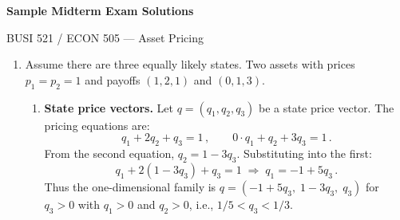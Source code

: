 



\centerline{\Large \textbf{Sample Midterm Exam Solutions}}
\baselineskip
\centerline{\large BUSI 521 / ECON 505 --- Asset Pricing}
\baselineskip

\begin{enumerate}

\item Assume there are three equally likely states.  Two assets with prices $p_1=p_2=1$ and payoffs $(1,2,1)$ and $(0,1,3)$.

\begin{enumerate}
\item[(a)] \textbf{State price vectors.}  Let $q=(q_1,q_2,q_3)$ be a state price vector.  The pricing equations are:
\[
q_1 + 2q_2 + q_3 = 1\,,\qquad 0\cdot q_1 + q_2 + 3q_3 = 1\,.
\]
From the second equation, $q_2 = 1 - 3q_3$.  Substituting into the first:
\[
q_1 + 2(1-3q_3) + q_3 = 1 \;\Longrightarrow\; q_1 = -1 + 5q_3\,.
\]
Thus the one-dimensional family is $q = (-1+5q_3,\; 1-3q_3,\; q_3)$ for $q_3 > 0$ with $q_1>0$ and $q_2>0$, i.e., $1/5 < q_3 < 1/3$.


\end{enumerate}
\end{enumerate}
